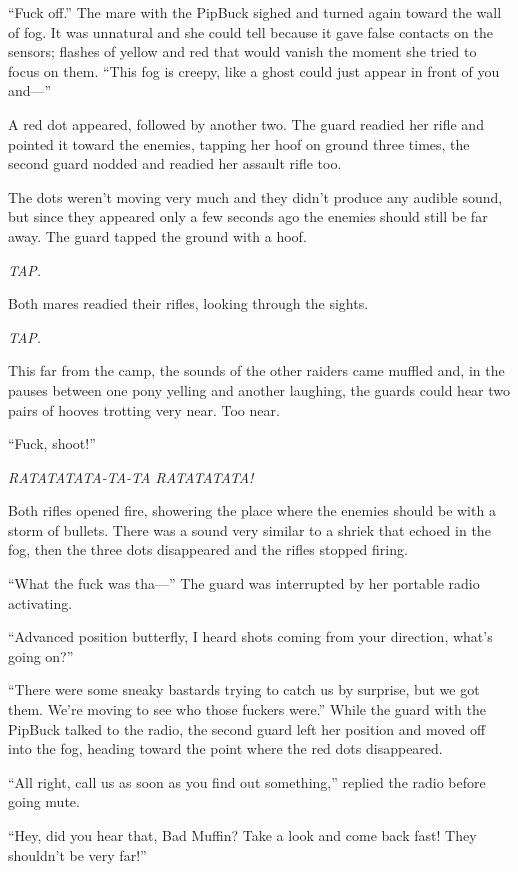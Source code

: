 ``Fuck off.'' The mare with the PipBuck sighed and turned again toward the wall of fog. It was unnatural and she could tell because it gave false contacts on the sensors; flashes of yellow and red that would vanish the moment she tried to focus on them. ``This fog is creepy, like a ghost could just appear in front of you and---''

A red dot appeared, followed by another two. The guard readied her rifle and pointed it toward the enemies, tapping her hoof on ground three times, the second guard nodded and readied her assault rifle too.

The dots weren't moving very much and they didn't produce any audible sound, but since they appeared only a few seconds ago the enemies should still be far away. The guard tapped the ground with a hoof.

\emph{TAP.}

Both mares readied their rifles, looking through the sights.

\emph{TAP.}

This far from the camp, the sounds of the other raiders came muffled and, in the pauses between one pony yelling and another laughing, the guards could hear two pairs of hooves trotting very near. Too near.

``Fuck, shoot!''

\emph{RATATATATA-TA-TA RATATATATA!}

Both rifles opened fire, showering the place where the enemies should be with a storm of bullets. There was a sound very similar to a shriek that echoed in the fog, then the three dots disappeared and the rifles stopped firing.

``What the fuck was tha---'' The guard was interrupted by her portable radio activating.

``Advanced position butterfly, I heard shots coming from your direction, what's going on?''

``There were some sneaky bastards trying to catch us by surprise, but we got them. We're moving to see who those fuckers were.'' While the guard with the PipBuck talked to the radio, the second guard left her position and moved off into the fog, heading toward the point where the red dots disappeared.

``All right, call us as soon as you find out something,'' replied the radio before going mute.

``Hey, did you hear that, Bad Muffin? Take a look and come back fast! They shouldn't be very far!''

